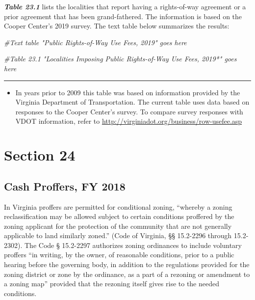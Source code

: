 \documentclass[
]{book}
\newenvironment{Shaded}{\begin{snugshade}}{\end{snugshade}}
\newcommand{\CommentTok}[1]{\textcolor[rgb]{0.56,0.35,0.01}{\textit{#1}}}
\providecommand{\tightlist}{%
  \setlength{\itemsep}{0pt}\setlength{\parskip}{0pt}}
\begin{document}
\textbf{\emph{Table 23.1}} lists the localities that report having a rights-of-way agreement or a prior agreement that has been grand-fathered. The information is based on the Cooper Center's 2019 survey. The text table below summarizes the results:

\begin{Shaded}
\begin{Highlighting}[]
\CommentTok{\#Text table "Public Rights{-}of{-}Way Use Fees, 2019" goes here}

\CommentTok{\#Table 23.1 "Localities Imposing Public Rights{-}of{-}Way Use Fees, 2019*" goes here}
\end{Highlighting}
\end{Shaded}

\begin{center}\rule{0.5\linewidth}{0.5pt}\end{center}

\begin{itemize}
\tightlist
\item
  In years prior to 2009 this table was based on information provided by the Virginia Department of Transportation. The current table uses data based on responses to the Cooper Center's survey. To compare survey responses with VDOT information, refer to \url{http://virginiadot.org/business/row-usefee.asp}
\end{itemize}

\hypertarget{section-24}{%
\chapter{Section 24}\label{section-24}}

\hypertarget{cash-proffers-fy-2018}{%
\section{Cash Proffers, FY 2018}\label{cash-proffers-fy-2018}}

In Virginia proffers are permitted for conditional zoning, ``whereby a zoning reclassification may be allowed subject to certain conditions proffered by the zoning applicant for the protection of the community that are not generally applicable to land similarly zoned.'' (Code of Virginia, §§ 15.2-2296 through 15.2-2302). The Code § 15.2-2297 authorizes zoning ordinances to include voluntary proffers ``in writing, by the owner, of reasonable conditions, prior to a public hearing before the governing body, in addition to the regulations provided for the zoning district or zone by the ordinance, as a part of a rezoning or amendment to a zoning map'' provided that the rezoning itself gives rise to the needed conditions.
\end{document}
